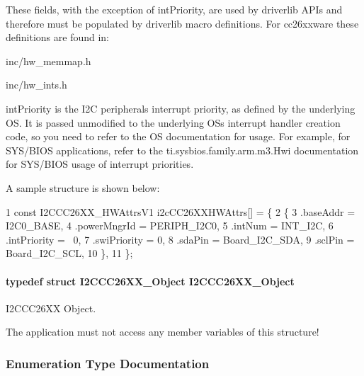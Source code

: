 These fields, with the exception of int\+Priority, are used by driverlib A\+P\+Is and therefore must be populated by driverlib macro definitions. For cc26xxware these definitions are found in\+:
\begin{DoxyItemize}
\item inc/hw\+\_\+memmap.\+h
\item inc/hw\+\_\+ints.\+h
\end{DoxyItemize}

int\+Priority is the I2\+C peripheral\textquotesingle{}s interrupt priority, as defined by the underlying O\+S. It is passed unmodified to the underlying O\+S\textquotesingle{}s interrupt handler creation code, so you need to refer to the O\+S documentation for usage. For example, for S\+Y\+S/\+B\+I\+O\+S applications, refer to the ti.\+sysbios.\+family.\+arm.\+m3.\+Hwi documentation for S\+Y\+S/\+B\+I\+O\+S usage of interrupt priorities.

A sample structure is shown below\+: 
\begin{DoxyCode}
1 const I2CCC26XX\_HWAttrsV1 i2cCC26XXHWAttrs[] = \{
2     \{
3        .baseAddr = I2C0\_BASE,
4        .powerMngrId = PERIPH\_I2C0,
5        .intNum = INT\_I2C,
6        .intPriority = ~0,
7        .swiPriority = 0,
8        .sdaPin = Board\_I2C\_SDA,
9        .sclPin = Board\_I2C\_SCL,
10     \},
11 \};
\end{DoxyCode}
\paragraph[{I2\+C\+C\+C26\+X\+X\+\_\+\+Object}]{\setlength{\rightskip}{0pt plus 5cm}typedef struct {\bf I2\+C\+C\+C26\+X\+X\+\_\+\+Object}  {\bf I2\+C\+C\+C26\+X\+X\+\_\+\+Object}}\label{_i2_c_c_c26_x_x_8h_a0eb1b66d08f9584c404d1610f8282394}


I2\+C\+C\+C26\+X\+X Object. 

The application must not access any member variables of this structure! 

\subsubsection{Enumeration Type Documentation}
